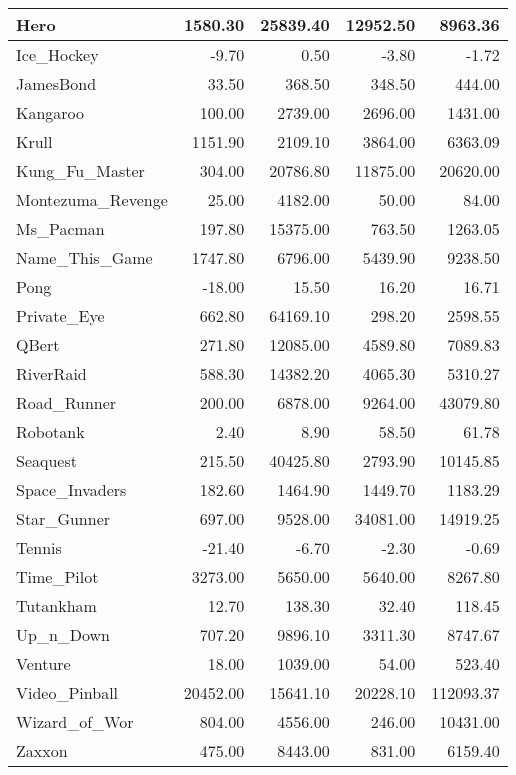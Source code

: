 \begin{table*}[h]
\begin{tabular}{l|r|r|r|r}
		\hline
		Hero & 1580.30 & 25839.40 & 12952.50 & 8963.36 \\
		\hline
		Ice\_Hockey & -9.70 & 0.50 & -3.80 & -1.72 \\
		\hline
		JamesBond & 33.50 & 368.50 & 348.50 & 444.00 \\
		\hline
		Kangaroo & 100.00 & 2739.00 & 2696.00 & 1431.00 \\
		\hline
		Krull & 1151.90 & 2109.10 & 3864.00 & 6363.09 \\
		\hline
		Kung\_Fu\_Master & 304.00 & 20786.80 & 11875.00 & 20620.00 \\
		\hline
		Montezuma\_Revenge & 25.00 & 4182.00 & 50.00 & 84.00 \\
		\hline
		Ms\_Pacman & 197.80 & 15375.00 & 763.50 & 1263.05 \\
		\hline
		Name\_This\_Game & 1747.80 & 6796.00 & 5439.90 & 9238.50 \\
		\hline
		Pong & -18.00 & 15.50 & 16.20 & 16.71 \\
		\hline
		Private\_Eye & 662.80 & 64169.10 & 298.20 & 2598.55 \\
		\hline
		QBert & 271.80 & 12085.00 & 4589.80 & 7089.83 \\
		\hline
		RiverRaid & 588.30 & 14382.20 & 4065.30 & 5310.27 \\
		\hline
		Road\_Runner & 200.00 & 6878.00 & 9264.00 & 43079.80 \\
		\hline
		Robotank & 2.40 & 8.90 & 58.50 & 61.78 \\
		\hline
		Seaquest & 215.50 & 40425.80 & 2793.90 & 10145.85 \\
		\hline
		Space\_Invaders & 182.60 & 1464.90 & 1449.70 & 1183.29 \\
		\hline
		Star\_Gunner & 697.00 & 9528.00 & 34081.00 & 14919.25 \\
		\hline
		Tennis & -21.40 & -6.70 & -2.30 & -0.69 \\
		\hline
		Time\_Pilot & 3273.00 & 5650.00 & 5640.00 & 8267.80 \\
		\hline
		Tutankham & 12.70 & 138.30 & 32.40 & 118.45 \\
		\hline
		Up\_n\_Down & 707.20 & 9896.10 & 3311.30 & 8747.67 \\
		\hline
		Venture & 18.00 & 1039.00 & 54.00 & 523.40 \\
		\hline
		Video\_Pinball & 20452.00 & 15641.10 & 20228.10 & 112093.37 \\
		\hline
		Wizard\_of\_Wor & 804.00 & 4556.00 & 246.00 & 10431.00 \\
		\hline
		Zaxxon & 475.00 & 8443.00 & 831.00 & 6159.40 \\
		\hline
	\end{tabular}
\end{table*}

